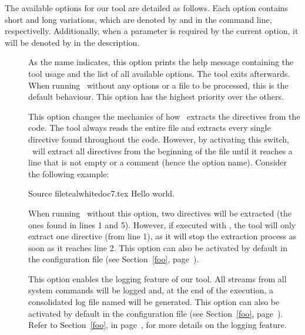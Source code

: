 The available options for our tool are detailed as follows. Each option contains short and long variations, which are denoted by  and  in the command line, respectivelly. Additionally, when a parameter is required by the current option, it will be denoted by  in the description.

\begin{description}
\item[] As the name indicates, this option prints the help message containing the tool usage and the list of all available options. The tool exits afterwards. When running \arara\ without any options or a file to be processed, this is the default behaviour. This option has the highest priority over the others.

\item[] This option changes the mechanics of how \arara\ extracts the directives from the code. The tool always reads the entire file and extracts every single directive found throughout the code. However, by activating this switch, \arara\ will extract all directives from the beginning of the file until it reaches a line that is not empty or a comment (hence the option name). Consider the following example:

\begin{ncodebox}{Source file}{teal}{\icnote}{white}{doc7.tex}
Hello world.
\bye

\end{ncodebox}

When running \arara\ without this option, two directives will be extracted (the ones found in lines 1 and 5). However, if executed with , the tool will only extract one directive (from line 1), as it will stop the extraction process as soon as it reaches line 2. This option can also be activated by default in the configuration file (see Section~\ref{foo}, page~\pageref{foo}).

\item[] This option enables the logging feature of our tool. All streams from all system commands will be logged and, at the end of the execution, a consolidated log file named  will be generated. This option can also be activated by default in the configuration file (see Section~\ref{foo}, page~\pageref{foo}). Refer to Section~\ref{foo}, in page~\pageref{foo}, for more details on the logging feature.


\end{description}
